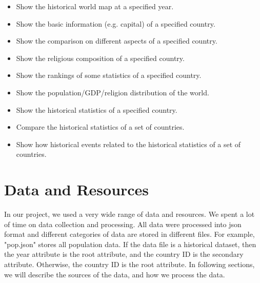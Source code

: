 \documentclass[12pt, fullpage,letterpaper]{article}
\begin{document}
\begin{itemize}

    \item Show the historical world map at a specified year.

    \item Show the basic information (e.g. capital) of a specified country.

    \item Show the comparison on different aspects of a specified country.

    \item Show the religious composition of a specified country.

    \item Show the rankings of some statistics of a specified country.

    \item Show the population/GDP/religion distribution of the world.

    \item Show the historical statistics of a specified country.

    \item Compare the historical statistics of a set of countries.

    \item Show how historical events related to the historical statistics of a set of countries.

\end{itemize}

\section{Data and Resources}
In our project, we used a very wide range of data and resources. We spent a lot of time on data collection and processing.
    All data were processed into json format and different categories
    of data are stored in different files. For example, "pop.json" stores all population data.
    If the data file is a historical dataset, then the year attribute is the root attribute, and the country ID is the secondary attribute.
    Otherwise, the country ID is the root attribute.
In following sections, we will describe the sources of the data, and how we process the data.
\end{document}
